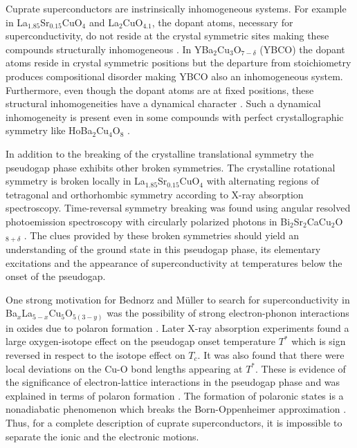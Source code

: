 Cuprate superconductors are instrinsically inhomogeneous systems.
For example in La$_{1.85}$Sr$_{0.15}$CuO$_{4}$ and La$_{2}$CuO$_{4.1}$, the dopant atoms, necessary for superconductivity, do not reside at the crystal symmetric sites making these compounds structurally inhomogeneous \cite{Poccia2011}.
In YBa$_2$Cu$_3$O$_{7-\delta}$ (YBCO) the dopant atoms reside in crystal symmetric positions but the departure from stoichiometry produces compositional disorder \cite{Chen1988,Andersen1990} making YBCO also an inhomogeneous system.
Furthermore, even though the dopant atoms are at fixed positions, these structural inhomogeneities have a dynamical character \cite{Mihailovic2005,Bianconi1996}.
Such a dynamical inhomogeneity is present even in some compounds with perfect crystallographic symmetry like HoBa$_{2}$Cu$_{4}$O$_{8}$ \cite{RubioTemprano2000}.

In addition to the breaking of the crystalline translational symmetry the pseudogap phase exhibits other broken symmetries. 
The crystalline rotational symmetry is broken locally in La$_{1.85}$Sr$_{0.15}$CuO$_{4}$ with alternating regions of tetragonal and orthorhombic symmetry \cite{Bianconi1996} according to X-ray absorption spectroscopy. 
Time-reversal symmetry breaking was found using angular resolved photoemission spectroscopy with circularly polarized photons in Bi$_{2}$Sr$_{2}$CaCu$_{2}$O$_{8+\delta}$ \cite{Kaminski2002}. 
The clues provided by these broken symmetries should yield an understanding of the ground state in this pseudogap phase, its elementary excitations and the appearance of superconductivity at temperatures below the onset of the pseudogap. 

One strong motivation for Bednorz and M\"{u}ller to search for superconductivity in Ba$_x$La$_{5-x}$Cu$_5$O$_{5(3-y)}$ was the possibility of strong electron-phonon interactions in oxides due to polaron formation \cite{Bednorz1986}.
Later X-ray absorption experiments found a large oxygen-isotope effect on the pseudogap onset temperature $T^*$ which is sign reversed in respect to the isotope effect on $T_c$.
It was also found that there were local deviations on the Cu-O bond lengths appearing at $T^*$.
These is evidence of the significance of electron-lattice interactions in the pseudogap phase and was explained in terms of polaron formation \cite{MustredeLeon1992}.
The formation of polaronic states is a nonadiabatic phenomenon which breaks the Born-Oppenheimer approximation \cite{Born1927}.
Thus, for a complete description of cuprate superconductors, it is impossible to separate the ionic and the electronic motions.

